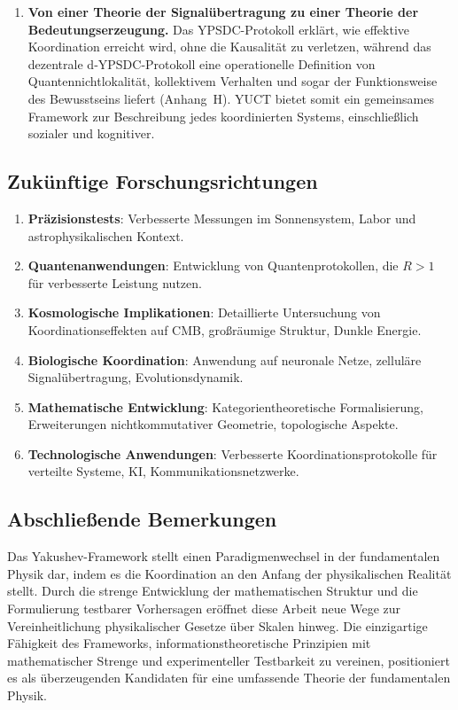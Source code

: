 \documentclass[11pt,a4paper]{article}
\begin{document}
\begin{enumerate}
		\item \textbf{Von einer Theorie der Signalübertragung zu einer Theorie der Bedeutungserzeugung.}
		Das YPSDC-Protokoll erklärt, wie effektive Koordination erreicht wird, ohne die Kausalität zu verletzen,
		während das dezentrale d‑YPSDC-Protokoll eine operationelle Definition von Quantennichtlokalität,
		kollektivem Verhalten und sogar der Funktionsweise des Bewusstseins liefert (Anhang~H).
		YUCT bietet somit ein gemeinsames Framework zur Beschreibung jedes koordinierten Systems,
		einschließlich sozialer und kognitiver.
	\end{enumerate}
	
	\subsection{Zukünftige Forschungsrichtungen}
	
	\begin{enumerate}
		\item \textbf{Präzisionstests}: Verbesserte Messungen im Sonnensystem, Labor und astrophysikalischen Kontext.
		
		\item \textbf{Quantenanwendungen}: Entwicklung von Quantenprotokollen, die $R>1$ für verbesserte Leistung nutzen.
		
		\item \textbf{Kosmologische Implikationen}: Detaillierte Untersuchung von Koordinationseffekten auf CMB, großräumige Struktur, Dunkle Energie.
		
		\item \textbf{Biologische Koordination}: Anwendung auf neuronale Netze, zelluläre Signalübertragung, Evolutionsdynamik.
		
		\item \textbf{Mathematische Entwicklung}: Kategorientheoretische Formalisierung, Erweiterungen nichtkommutativer Geometrie, topologische Aspekte.
		
		\item \textbf{Technologische Anwendungen}: Verbesserte Koordinationsprotokolle für verteilte Systeme, KI, Kommunikationsnetzwerke.
	\end{enumerate}
	
	\subsection{Abschließende Bemerkungen}
	
	Das Yakushev-Framework stellt einen Paradigmenwechsel in der fundamentalen Physik dar, indem es die Koordination an den Anfang der physikalischen Realität stellt. Durch die strenge Entwicklung der mathematischen Struktur und die Formulierung testbarer Vorhersagen eröffnet diese Arbeit neue Wege zur Vereinheitlichung physikalischer Gesetze über Skalen hinweg. Die einzigartige Fähigkeit des Frameworks, informationstheoretische Prinzipien mit mathematischer Strenge und experimenteller Testbarkeit zu vereinen, positioniert es als überzeugenden Kandidaten für eine umfassende Theorie der fundamentalen Physik.
	
\end{document}
